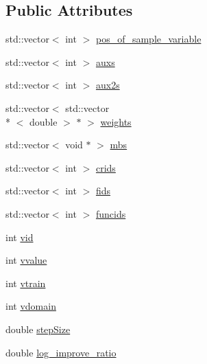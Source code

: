 \subsection*{Public Attributes}
\begin{DoxyCompactItemize}
\item 
std\-::vector$<$ int $>$ \hyperlink{classmia_1_1elly_1_1_sample_input_a88663ca6f136010fe91e6459314269da}{pos\-\_\-of\-\_\-sample\-\_\-variable}
\item 
std\-::vector$<$ int $>$ \hyperlink{classmia_1_1elly_1_1_sample_input_a786191b105d76064643ab015171221fa}{auxs}
\item 
std\-::vector$<$ int $>$ \hyperlink{classmia_1_1elly_1_1_sample_input_abae0c93ca188fa3f6a73bb198dbe8185}{aux2s}
\item 
std\-::vector$<$ std\-::vector\\*
$<$ double $>$ $\ast$ $>$ \hyperlink{classmia_1_1elly_1_1_sample_input_a34c24a75257fa27d5d728719afcdde43}{weights}
\item 
std\-::vector$<$ void $\ast$ $>$ \hyperlink{classmia_1_1elly_1_1_sample_input_a90a8ec0276ef33d9b540088e920590b3}{mbs}
\item 
std\-::vector$<$ int $>$ \hyperlink{classmia_1_1elly_1_1_sample_input_ada60cb9fdfced8b9f4050e0c4f4b9892}{crids}
\item 
std\-::vector$<$ int $>$ \hyperlink{classmia_1_1elly_1_1_sample_input_a059df0f264855a7c3546979e07d142a0}{fids}
\item 
std\-::vector$<$ int $>$ \hyperlink{classmia_1_1elly_1_1_sample_input_a1d6d5dd5a873392951ead77fbd08bfa0}{funcids}
\item 
int \hyperlink{classmia_1_1elly_1_1_sample_input_a9e9d587d3e2f5b0881121841c217baba}{vid}
\item 
int \hyperlink{classmia_1_1elly_1_1_sample_input_a89286408bf1f1ff6fa60b0427f246653}{vvalue}
\item 
int \hyperlink{classmia_1_1elly_1_1_sample_input_a1c929af5f0d6534c55217c43298f20fc}{vtrain}
\item 
int \hyperlink{classmia_1_1elly_1_1_sample_input_a8487498906d59dd89e3804c25f728829}{vdomain}
\item 
double \hyperlink{classmia_1_1elly_1_1_sample_input_ad67a5cd17d47a0b1ad54d919de682cd3}{step\-Size}
\item 
double \hyperlink{classmia_1_1elly_1_1_sample_input_a0016cf98d8b1a50f42a5b85e091e61f9}{log\-\_\-improve\-\_\-ratio}
\end{DoxyCompactItemize}


